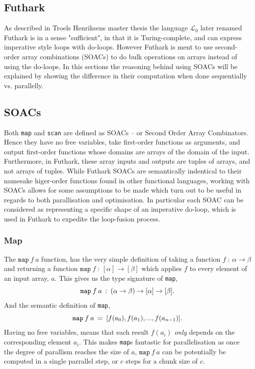 \documentclass[11pt]{article}
\begin{document}
\subsection{Futhark}
As described in Troels Henriksens master thesis \cite[The $\mathcal{L}_0$ language, p. 8]{MasterTroels} the language $\mathcal{L}_0$ later renamed Futhark is in a sense "sufficient", in that it is Turing-complete, and can express imperative style loops with do-loops. However Futhark is ment to use second-order array combinations (SOACs) to do bulk operations on arrays instead of using the do-loops. In this sections the reasoning behind using SOACs will be explained by showing the difference in their computation when done sequentially vs. parallelly.
\subsection{SOACs}
Both \texttt{map} and \texttt{scan} are defined as SOACs -- or Second Order Array Combinators. Hence they have no free variables, take first-order functions as arguments, and output first-order
 functions whose domains are arrays of the domain of the input. Furthermore, in Futhark, these array inputs and outputs are tuples of arrays, and not arrays of tuples.
While Futhark SOACs are semantically indentical to their namesake higer-order functions found in other functional languages, working with SOACs allows for some assumptions to be made
 which turn out to be useful in regards to both parallisation and optimisation. In particular each SOAC can be considered as representing a specific shape of an imperative do-loop, which
 is used in Futhark to expedite the loop-fusion process. \cite[chap. 7]{MasterTroels}

\subsubsection{Map}
The $\texttt{map} \: f \: a$ function, has the very simple definition of taking a function $f \: : \: \alpha \to \beta$ and returning a function $\mathtt{map} \:f \: : \: [\alpha] \to [\beta]$  which
 applies $f$ to every element of an input array, $a$.  This gives us the type signature of \texttt{map},
$$\mathtt{map} \: f \: a \: :  \: (\alpha \to \beta) \to [\alpha] \to [\beta]\mathnormal{.}$$
And the semantic definition of \texttt{map},
$$\mathtt{map} \: f \: a \: =  \: [f(a_0), f(a_1), ..., f(a_{n-1})]\mathnormal{.}$$
Having no free variables, means that each result $f(a_i)$ \textit{only} depends on the corresponding element $a_i$. This makes \texttt{map}s fantastic for parallelisation as once the
 degree of parallism reaches the size of $a$, $\mathtt{map} \: f \: a$ can be potentially be computed in a single parrallel step, or $c$ steps for a chunk size of $c$.
\end{document}
